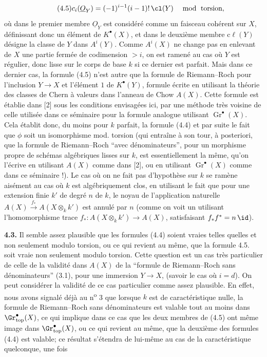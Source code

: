 
\begin{equation}\tag{4.5}
 c_i(\underline{O}_Y)=(-1)^{i-1}(i-1)!\,\cl(Y)\quad \bmod
\text{ torsion},
\end{equation}
où dans le premier membre $\underline{O}_Y$ est considéré comme un faisceau cohérent sur $X$, définissant donc un élément de $K^\bullet(X)$, et dans le deuxième membre $\mathrm{c}\ell(Y)$ désigne la classe de $Y$ dans $A^i(Y)$. Comme $A^i(X)$ ne change pas en enlevant de $X$ une partie fermée de codimension $>i$, on est ramené au cas où $Y$ est régulier, donc lisse sur le corps de base $k$ si ce dernier est parfait. Mais dans ce dernier cas, la formule (4.5) n'est autre que la formule de Riemann--Roch pour l'inclusion $Y\to X$ et l'élément $1$ de $K^\bullet(Y)$, formule écrite en utilisant la théorie des classes de Chern à valeurs dans l'anneau de Chow $A(X)$. Cette formule est établie dans [2] sous les conditions envisagées ici, par une méthode très voisine de celle utilisée dans ce séminaire pour la formule analogue utilisant $\operatorname{Gr}^\bullet(X)$. Cela établit donc, du moins pour $k$ parfait, la formule (4.4) et par suite le fait que $\phi$ soit un isomorphisme mod. torsion (qui entraîne à son tour, à posteriori, que la formule de Riemann--Roch ``avec dénominateurs'', pour un morphisme propre de schémas algébriques lisses sur $k$, est essentiellement la même, qu'on l'écrive en utilisant $A(X)$ comme dans [2], ou en utilisant $\operatorname{Gr}^\bullet(X)$ comme dans ce séminaire !). Le cas où on ne fait pas d'hypothèse sur $k$ se ramène aisément au cas où $k$ est algébriquement clos, en utilisant le fait que pour une extension finie $k'$ de degré $n$ de $k$, le noyau de l'application naturelle $A(X)\xrightarrow{f_*}A(X\otimes_k k')$ est annulé par $n$ (comme on voit un utilisant l'homomorphisme trace $f_*:A(X\otimes_k k')\to A(X)$, satisfaisant $f_*f^*=n\,\id$).

\textbf{4.3.} Il semble assez plausible que les formules (4.4) soient vraies telles quelles et non seulement modulo torsion, ou ce qui revient au même, que la formule 4.5. soit vraie non seulement modulo torsion. Cette question est un cas très particulier de celle de la validité dans $A(X)$ de la ``formule de Riemann--Roch sans dénominateurs'' (3.1), pour une immersion $Y\to X$, (savoir le cas où $i=d$). On peut considérer la validité de ce cas particulier comme assez plausible. En effet, nous avons signalé déjà au n\textsuperscript{o} 3 que lorsque $k$ est de caractéristique nulle, la formule de Riemann--Roch sans dénominateurs est valable tout au moins dans $\Gr^{\bullet}_{\mathrm{top}}(X)$, ce qui implique dans ce cas que les deux membres de (4.5) ont même image dans $\Gr^{\bullet}_{\mathrm{top}}(X)$, ou ce qui revient au même, que la deuxième des formules (4.4) est valable; ce résultat s'étendra de lui-même au cas de la caractéristique quelconque, une fois 
